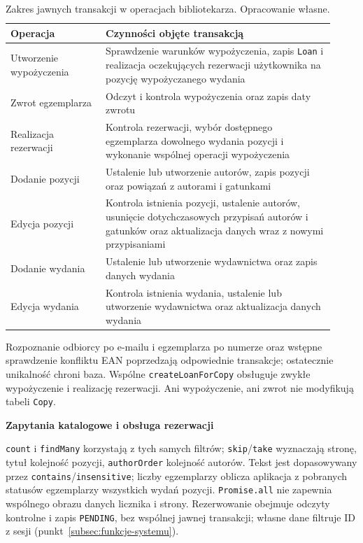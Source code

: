 \documentclass[11pt, a4paper]{article}
\begin{document}
\begin{table}[htbp]
\centering
\caption{Zakres jawnych transakcji w operacjach bibliotekarza. Opracowanie własne.}
\label{tab:transakcje-biblioteczne}
\normalsize
\begin{tabular}{@{}p{0.27\linewidth}p{0.65\linewidth}@{}}
\toprule
\textbf{Operacja} & \textbf{Czynności objęte transakcją} \\
\midrule
Utworzenie wypożyczenia & Sprawdzenie warunków wypożyczenia, zapis
\texttt{Loan} i realizacja oczekujących
rezerwacji użytkownika na pozycję wypożyczanego wydania \\

Zwrot egzemplarza & Odczyt i kontrola wypożyczenia oraz zapis daty
zwrotu \\

Realizacja rezerwacji & Kontrola rezerwacji, wybór dostępnego
egzemplarza dowolnego wydania pozycji i wykonanie wspólnej operacji
wypożyczenia \\

Dodanie pozycji & Ustalenie lub utworzenie autorów,
zapis pozycji oraz powiązań z autorami i gatunkami \\

Edycja pozycji & Kontrola istnienia pozycji, ustalenie autorów,
usunięcie dotychczasowych przypisań autorów i gatunków oraz
aktualizacja danych wraz z nowymi przypisaniami \\

Dodanie wydania & Ustalenie lub utworzenie wydawnictwa
oraz zapis danych wydania \\

Edycja wydania & Kontrola istnienia wydania, ustalenie lub utworzenie
wydawnictwa oraz aktualizacja danych wydania \\
\bottomrule
\end{tabular}
\end{table}

Rozpoznanie odbiorcy po e-mailu i egzemplarza po numerze oraz wstępne sprawdzenie konfliktu EAN poprzedzają odpowiednie transakcje; ostatecznie unikalność chroni baza. Wspólne \texttt{createLoanForCopy} obsługuje zwykłe wypożyczenie i realizację rezerwacji. Ani wypożyczenie, ani zwrot nie modyfikują tabeli \texttt{Copy}.

\noindent\textbf{Zapytania katalogowe i obsługa rezerwacji}

\texttt{count} i \texttt{findMany} korzystają z tych samych filtrów; \texttt{skip}/\texttt{take} wyznaczają stronę, tytuł kolejność pozycji, \texttt{authorOrder} kolejność autorów. Tekst jest dopasowywany przez \texttt{contains}/\texttt{insensitive}; liczby egzemplarzy oblicza aplikacja z pobranych statusów egzemplarzy wszystkich wydań pozycji. \texttt{Promise.all} nie zapewnia wspólnego obrazu danych licznika i strony. Rezerwowanie obejmuje odczyty kontrolne i zapis \texttt{PENDING}, bez wspólnej jawnej transakcji; własne dane filtruje ID z sesji (punkt~\ref{subsec:funkcje-systemu}).
\end{document}
